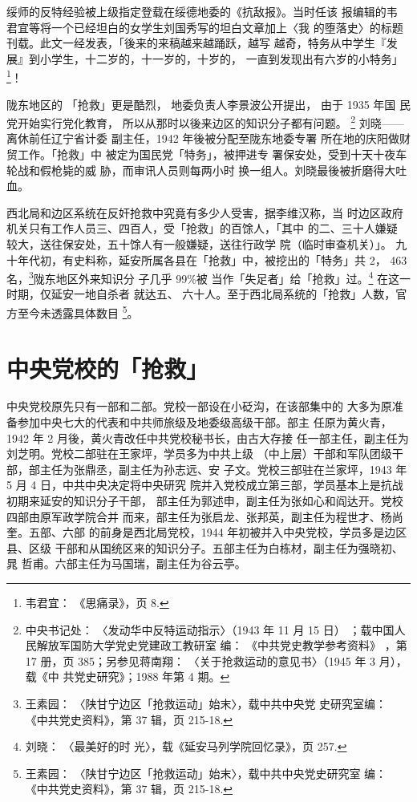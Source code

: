 绥师的反特经验被上级指定登载在绥德地委的《抗敌报》。当时任该 报编辑的韦
君宜等将一个已经坦白的女学生刘国秀写的坦白文章加上〈我 的堕落史〉的标题
刊载。此文一经发表，「後来的来稿越来越踊跃，越写 越奇，特务从中学生『发
展』到小学生，十二岁的，十一岁的，十岁的， 一直到发现出有六岁的小特务」
\footnote{韦君宜： 《思痛录》，页 8.}！

陇东地区的 「抢救」更是酷烈， 地委负责人李景波公开提出， 由于 1935 年国
民党开始实行党化教育， 所以从那时以後来边区的知识分子都有问题。
\footnote{中央书记处： 〈发动华中反特运动指示〉（1943 年 11 月 15 日）
；载中国人民解放军国防大学党史党建政工教研室 编： 《中共党史教学参考资料》
，第 17 册，页 385；另参见蒋南翔： 〈关于抢救运动的意见书〉（1945 年 3
月），载《中 共党史研究》；1988 年第 4 期。} 刘晓——离休前任辽宁省计委
副主任，1942 年後被分配至陇东地委专署 所在地的庆阳做财贸工作。「抢救」中
被定为国民党「特务」，被押进专 署保安处，受到十天十夜车轮战和假枪毙的威
胁，而审讯人员则每两小时 换一组人。刘晓最後被折磨得大吐血。


西北局和边区系统在反奸抢救中究竟有多少人受害，据李维汉称，当 时边区政府
机关只有工作人员三、四百人，受「抢救」的百馀人，「其中 的二、三十人嫌疑
较大，送往保安处，五十馀人有一般嫌疑，送往行政学 院（临时审查机关）」。
九十年代初，有史料称，延安所属各县在「抢救」中，被挖出的「特务」共 2，
463 名，\footnote{王素园： 〈陕甘宁边区「抢救运动」始末〉，载中共中央党
史研究室编： 《中共党史资料》，第 37 辑，页 215-18.}陇东地区外来知识分
子几乎 99\%被 当作「失足者」给「抢救」过。\footnote{刘晓： 〈最美好的时
光〉，载《延安马列学院回忆录》，页 257.} 在这一时期，仅延安一地自杀者
就达五、 六十人。至于西北局系统的「抢救」人数，官方至今未透露具体数目
\footnote{王素园： 〈陕甘宁边区「抢救运动」始末〉，载中共中央党史研究室
编： 《中共党史资料》，第 37 辑，页 215-18.}。


\section{中央党校的「抢救」}

中央党校原先只有一部和二部。党校一部设在小砭沟，在该部集中的
大多为原准备参加中央七大的代表和中共师旅级及地委级高级干部。部主
任原为黄火青，1942 年 2 月後，黄火青改任中共党校秘书长，由古大存接
任一部主任，副主任为刘芝明。党校二部驻在王家坪，学员多为中共上级
（中上层）干部和军队团级干部，部主任为张鼎丞，副主任为孙志远、安
子文。党校三部驻在兰家坪，1943 年 5 月 4 日，中共中央决定将中央研究
院并入党校成立第三部，学员基本上是抗战初期来延安的知识分子干部，
部主任为郭述申，副主任为张如心和阎达开。党校四部由原军政学院合并
而来，部主任为张启龙、张邦英，副主任为程世才、杨尚奎。五部、六部
的前身是西北局党校，1944 年初被并入中央党校，学员多是边区县、区级
干部和从国统区来的知识分子。五部主任为白栋材，副主任为强晓初、晁
哲甫。六部主任为马国瑞，副主任为谷云亭。

